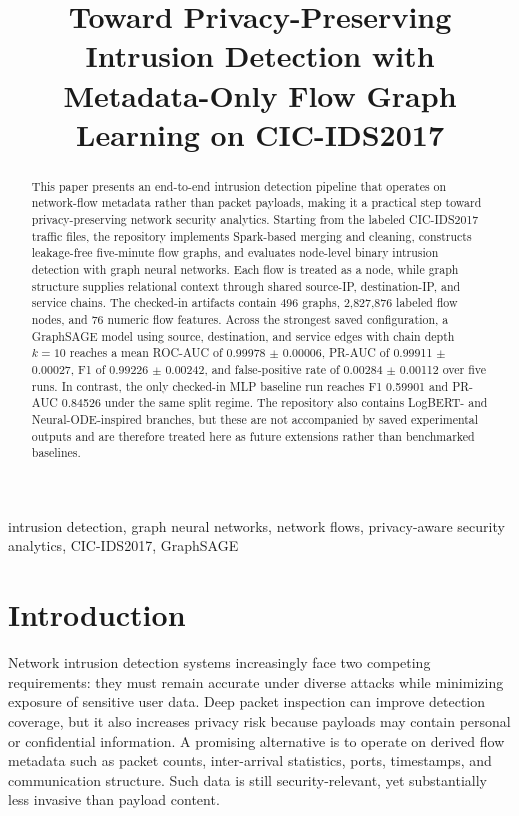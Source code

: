 \documentclass[conference]{IEEEtran}
\begin{document}
\title{Toward Privacy-Preserving Intrusion Detection with Metadata-Only Flow Graph Learning on CIC-IDS2017}

\author{
}

\maketitle

\begin{abstract}
This paper presents an end-to-end intrusion detection pipeline that operates on network-flow metadata rather than packet payloads, making it a practical step toward privacy-preserving network security analytics. Starting from the labeled CIC-IDS2017 traffic files, the repository implements Spark-based merging and cleaning, constructs leakage-free five-minute flow graphs, and evaluates node-level binary intrusion detection with graph neural networks. Each flow is treated as a node, while graph structure supplies relational context through shared source-IP, destination-IP, and service chains. The checked-in artifacts contain 496 graphs, 2,827,876 labeled flow nodes, and 76 numeric flow features. Across the strongest saved configuration, a GraphSAGE model using source, destination, and service edges with chain depth $k=10$ reaches a mean ROC-AUC of 0.99978 $\pm$ 0.00006, PR-AUC of 0.99911 $\pm$ 0.00027, F1 of 0.99226 $\pm$ 0.00242, and false-positive rate of 0.00284 $\pm$ 0.00112 over five runs. In contrast, the only checked-in MLP baseline run reaches F1 0.59901 and PR-AUC 0.84526 under the same split regime. The repository also contains LogBERT- and Neural-ODE-inspired branches, but these are not accompanied by saved experimental outputs and are therefore treated here as future extensions rather than benchmarked baselines.
\end{abstract}

\begin{IEEEkeywords}
intrusion detection, graph neural networks, network flows, privacy-aware security analytics, CIC-IDS2017, GraphSAGE
\end{IEEEkeywords}

\section{Introduction}
Network intrusion detection systems increasingly face two competing requirements: they must remain accurate under diverse attacks while minimizing exposure of sensitive user data. Deep packet inspection can improve detection coverage, but it also increases privacy risk because payloads may contain personal or confidential information. A promising alternative is to operate on derived flow metadata such as packet counts, inter-arrival statistics, ports, timestamps, and communication structure. Such data is still security-relevant, yet substantially less invasive than payload content.
\end{document}
